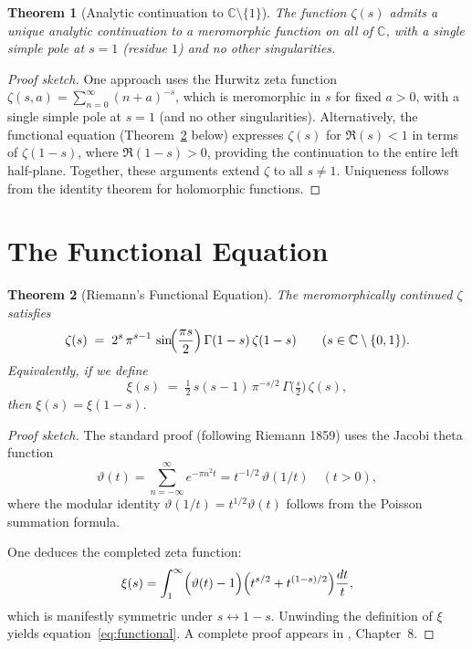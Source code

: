 \documentclass[12pt,a4paper]{amsart}
\newtheorem{theorem}{Theorem}[section]
\theoremstyle{definition}
\newcommand{\C}{\mathbb{C}}
\begin{document}
\begin{theorem}[Analytic continuation to $\C \setminus \{1\}$]
\label{thm:full_continuation}
The function $\zeta(s)$ admits a unique analytic continuation to a meromorphic
function on all of $\C$, with a single simple pole at $s = 1$ (residue $1$)
and no other singularities.
\end{theorem}

\begin{proof}[Proof sketch]
One approach uses the Hurwitz zeta function
$\zeta(s, a) = \sum_{n=0}^\infty (n+a)^{-s}$, which is meromorphic in $s$
for fixed $a > 0$, with a single simple pole at $s = 1$ (and no other
singularities).  Alternatively, the functional equation
(Theorem~\ref{thm:functional_eq} below) expresses $\zeta(s)$ for
$\Re(s) < 1$ in terms of $\zeta(1-s)$, where $\Re(1-s) > 0$,
providing the continuation to the entire left half-plane.
Together, these arguments extend $\zeta$ to all $s \ne 1$.
Uniqueness follows from the identity theorem for holomorphic functions.
\end{proof}

\section{The Functional Equation}

\begin{theorem}[Riemann's Functional Equation]
\label{thm:functional_eq}
The meromorphically continued $\zeta$ satisfies
\begin{equation}
  \label{eq:functional}
  \zeta(s) \;=\; 2^s\,\pi^{s-1}\,\sin\!\Bigl(\frac{\pi s}{2}\Bigr)\,
  \Gamma(1-s)\,\zeta(1-s)
  \qquad (s \in \C \setminus \{0,1\}).
\end{equation}
Equivalently, if we define
\[
  \xi(s) \;=\; \tfrac{1}{2}\,s(s-1)\,\pi^{-s/2}\,\Gamma\!\bigl(\tfrac{s}{2}\bigr)\,\zeta(s),
\]
then $\xi(s) = \xi(1-s)$.
\end{theorem}

\begin{proof}[Proof sketch]
The standard proof (following Riemann 1859) uses the Jacobi theta function
\[
  \vartheta(t) = \sum_{n=-\infty}^{\infty} e^{-\pi n^2 t}
  = t^{-1/2}\,\vartheta(1/t) \quad (t > 0),
\]
where the modular identity $\vartheta(1/t) = t^{1/2}\vartheta(t)$ follows
from the Poisson summation formula.

One deduces the completed zeta function:
\[
  \xi(s) = \int_1^{\infty} \Bigl(\vartheta(t) - 1\Bigr)
  \Bigl(t^{s/2} + t^{(1-s)/2}\Bigr)\frac{dt}{t},
\]
which is manifestly symmetric under $s \leftrightarrow 1-s$.
Unwinding the definition of $\xi$ yields equation~\eqref{eq:functional}.
A complete proof appears in \cite{Davenport2000}, Chapter~8.
\end{proof}
\end{document}
